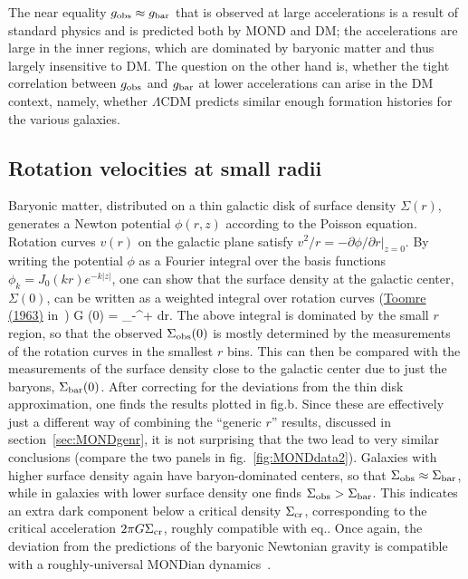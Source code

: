The  near equality $g_{\rm obs}\approx g_{\rm bar}$ that is observed at large accelerations is a result of standard physics and is predicted both by MOND and DM;
the accelerations are large in the inner regions, which are dominated by baryonic matter and thus largely insensitive to DM.
The question on the other hand is, whether the tight correlation between $g_{\rm obs}$ and $g_{\rm bar}$ at lower accelerations
can arise in the DM context, 
namely, whether $\Lambda$CDM predicts similar enough formation histories for the various galaxies.


\subsection{Rotation velocities at small radii}
Baryonic matter, distributed on a thin galactic disk of surface density $\Sigma(r)$,
generates a Newton potential $\phi(r,z)$ according to the Poisson equation.
Rotation curves $v(r)$ on the galactic plane satisfy $v^2/r = - \partial\phi/\partial r|_{z=0}$.
By writing the potential $\phi$ as a Fourier integral over the basis functions $\phi_k=J_0(kr) e^{-k|z|}$,
one can show  that the surface density at the galactic center, $\Sigma(0)$, can be written as a weighted integral over rotation curves 
(\href{https://ui.adsabs.harvard.edu/abs/1963ApJ...138..385T/abstract}{\color{verdes}Toomre (1963)} in~\cite{MONDr0})
\pi G \Sigma(0) =  \int_{-\infty}^{+\infty} d\ln r.
\eeq
The above integral is dominated by the small $r$ region, so that the observed $\Sigma_{\rm obs}(0)$ is mostly determined by the measurements of the rotation curves in the smallest $r$ bins.
This can then be compared with the measurements of  the surface density close to the galactic center due to just the baryons, $\Sigma_{\rm bar}(0)$. 
After correcting for the deviations from the thin disk approximation,
one finds the results plotted in fig.b.
Since these are effectively just a different way of combining 
the ``generic $r$'' results, discussed in section~\ref{sec:MONDgenr}, 
it is not surprising that the two lead to very similar conclusions (compare the two panels in fig.~\ref{fig:MONDdata2}). 
Galaxies with higher surface density again have baryon-dominated centers,
so that $\Sigma_{\rm obs}\approx \Sigma_{\rm bar}$,
while  in galaxies with lower surface density one finds $\Sigma_{\rm obs}> \Sigma_{\rm bar}$.
This indicates an extra dark component below a critical density $\Sigma_{\rm cr}$,
corresponding to the critical acceleration $2\pi G \Sigma_{\rm cr}$, roughly compatible with eq..
Once again, the deviation from the predictions of the baryonic Newtonian gravity
is compatible with a roughly-universal MONDian dynamics~\cite{MONDr0}.


